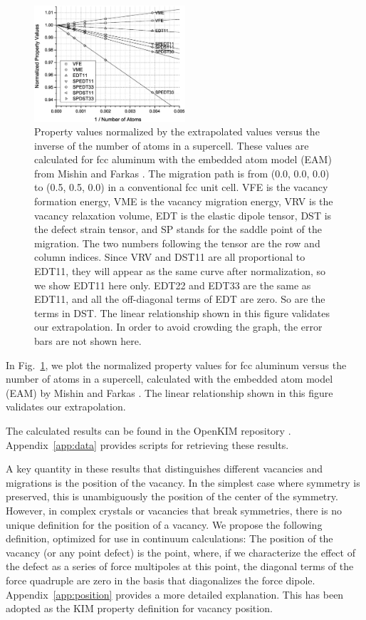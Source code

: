 \documentclass[%
 reprint,
 nofootinbib,
 amsmath,amssymb,
 aps,
]{revtex4-1}
\begin{document}
\begin{figure}
\centering
\includegraphics[width=0.5\textwidth, clip, trim = 10mm 10mm 10mm 10mm]{extrapolation2}%
\caption{\label{fig:extrapolation}
Property values normalized by the extrapolated values versus the inverse of the number of atoms in a supercell.
These values are calculated for fcc aluminum with the embedded atom model (EAM) from Mishin and Farkas \cite{mishin1999interatomic}.
The migration path is from (0.0, 0.0, 0.0) to (0.5, 0.5, 0.0) in a conventional fcc unit cell.
VFE is the vacancy formation energy, VME is the vacancy migration energy, VRV is the vacancy relaxation volume, EDT is the elastic dipole tensor, DST is the defect strain tensor, and SP stands for the saddle point of the migration.
The two numbers following the tensor are the row and column indices.
Since VRV and DST11 are all proportional to EDT11, they will appear as the same curve after normalization, so we show EDT11 here only.
EDT22 and EDT33 are the same as EDT11, and all the off-diagonal terms of EDT are zero.
So are the terms in DST.
The linear relationship shown in this figure validates our extrapolation.
In order to avoid crowding the graph, the error bars are not shown here.
}
\end{figure}

In Fig.~\ref{fig:extrapolation}, we plot the normalized property values for fcc aluminum versus the number of atoms in a supercell, calculated with the embedded atom model (EAM) by Mishin and Farkas \cite{mishin1999interatomic}.
The linear relationship shown in this figure validates our extrapolation.

The calculated results can be found in the OpenKIM repository \cite{openkim2016}.
Appendix~\ref{app:data} provides scripts for retrieving these results.

A key quantity in these results that distinguishes different vacancies and migrations is the position of the vacancy.
In the simplest case where symmetry is preserved, this is unambiguously the position of the center of the symmetry.
However, in complex crystals or vacancies that break symmetries, there is no unique definition for the position of a vacancy.
We propose the following definition, optimized for use in continuum calculations:
The position of the vacancy (or any point defect) is the point, where, if we characterize the effect of the defect as a series of force multipoles at this point, the diagonal terms of the force quadruple are zero in the basis that diagonalizes the force dipole.
Appendix~\ref{app:position} provides a more detailed explanation.
This has been adopted as the KIM property definition for vacancy position.
\end{document}
